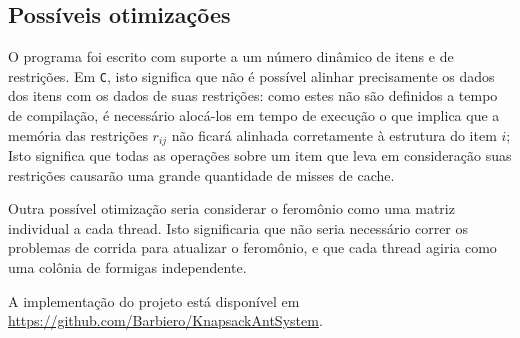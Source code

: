 \subsection{Possíveis otimizações}
O programa foi escrito com suporte a um número dinâmico de itens e de restrições. Em \texttt{C}, isto significa que não é possível alinhar precisamente os dados dos itens com os dados de suas restrições: como estes não são definidos a tempo de compilação, é necessário alocá-los em tempo de execução o que implica que a memória das restrições $r_{ij}$ não ficará alinhada corretamente à estrutura do item $i$; Isto significa que todas as operações sobre um item que leva em consideração suas restrições causarão uma grande quantidade de misses de cache.

Outra possível otimização seria considerar o feromônio como uma matriz individual a cada thread. Isto significaria que não seria necessário correr os problemas de corrida para atualizar o feromônio, e que cada thread agiria como uma colônia de formigas independente.

A implementação do projeto está disponível em \url{https://github.com/Barbiero/KnapsackAntSystem}.
